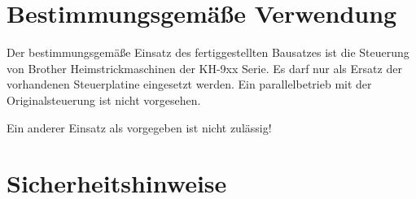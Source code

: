 \documentclass[fleqn,10pt]{SelfArx} %
\begin{document}

\section{Bestimmungsgemäße Verwendung}

Der bestimmungsgemäße Einsatz des fertiggestellten Bausatzes ist die Steuerung von Brother Heimstrickmaschinen der KH-9xx Serie. Es darf nur als Ersatz der vorhandenen Steuerplatine eingesetzt werden. Ein parallelbetrieb mit der Originalsteuerung ist nicht vorgesehen.

Ein anderer Einsatz als vorgegeben ist nicht zulässig!


\section{Sicherheitshinweise}
\end{document}
